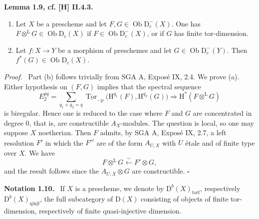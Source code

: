 \documentclass[12pt]{article}
\newcommand{\Tor}{\operatorname{Tor}}
\newcommand{\ob}{\operatorname{Ob}}
\newcommand{\D}{\mathrm D}
\newcommand{\Hh}{\mathrm H}
\newcommand{\qedtext}{\hfill$\square$}
\newenvironment{statement}[1]{\par\medskip\noindent\textbf{#1.}\ }{\par\medskip}
\newenvironment{prooftext}[1][Proof]{\par\noindent\emph{#1.}\ }{\par\medskip}
\begin{document}
\begin{statement}{Lemma 1.9, cf. [H] II.4.3}
\begin{enumerate}[label=\alph*)]
\item Let $X$ be a prescheme and let $F,G\in\ob\D_c^-(X)$. One has $F\otimes^{\mathrm L}G\in\ob\D_c(X)$ if $F\in\ob\D_c^-(X)$, or if $G$ has finite tor-dimension.
\item Let $f:X\to Y$ be a morphism of preschemes and let $G\in\ob\D_c^-(Y)$. Then $f^*(G)\in\ob\D_c(X)$.
\end{enumerate}
\end{statement}

\begin{prooftext}
Part (b) follows trivially from SGA A, Exposé IX, 2.4. We prove (a). Either hypothesis on $(F,G)$ implies that the spectral sequence
\[
   E_2^{pq}=\sum_{q_1+q_2=q}\underline{\Tor}_{-p}\bigl(\Hh^{q_1}(F),\Hh^{q_2}(G)\bigr)
       \Rightarrow \Hh^*(F\otimes^{\mathrm L}G)
\]
is biregular. Hence one is reduced to the case where $F$ and $G$ are concentrated in degree $0$, that is, are constructible $A_X$-modules. The question is local, so one may suppose $X$ noetherian. Then $F$ admits, by SGA A, Exposé IX, 2.7, a left resolution $F'$ in which the $F'^i$ are of the form $A_{U,X}$ with $U$ étale and of finite type over $X$. We have
\[
   F\otimes^{\mathrm L}G\xleftarrow{\sim}F'\otimes G,
\]
and the result follows since the $A_{U,X}\otimes G$ are constructible. \qedtext
\end{prooftext}

\begin{statement}{Notation 1.10}
If $X$ is a prescheme, we denote by $\D^b(X)_{\mathrm{torf}}$, respectively $\D^b(X)_{\mathrm{qinjf}}$, the full subcategory of $\D(X)$ consisting of objects of finite tor-dimension, respectively of finite quasi-injective dimension.
\end{statement}
\end{document}

